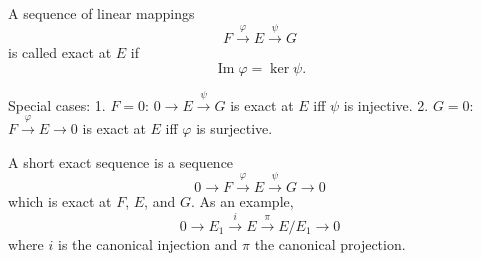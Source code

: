 A sequence of linear mappings
$$F \xrightarrow{\varphi} E \xrightarrow{\psi} G$$
is called exact at $E$ if
$$\operatorname{Im} \varphi = \ker \psi.$$

Special cases:
1. $F = 0$: $0 \to E \xrightarrow{\psi} G$ is exact at $E$ iff $\psi$ is injective.
2. $G = 0$: $F \xrightarrow{\varphi} E \to 0$ is exact at $E$ iff $\varphi$ is surjective.

A short exact sequence is a sequence
$$0 \to F \xrightarrow{\varphi} E \xrightarrow{\psi} G \to 0$$
which is exact at $F$, $E$, and $G$. As an example,
$$0 \to E_1 \xrightarrow{i} E \xrightarrow{\pi} E/E_1 \to 0$$
where $i$ is the canonical injection and $\pi$ the canonical projection.
